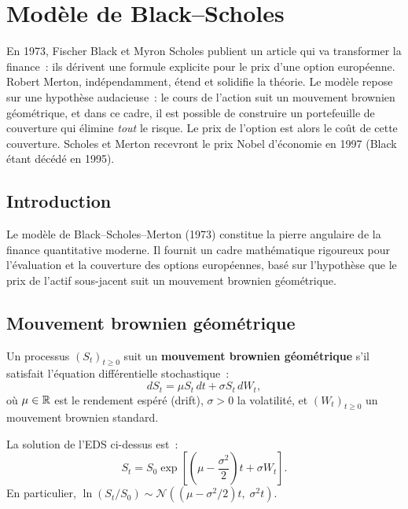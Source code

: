 \chapter{Mod\`ele de Black--Scholes}
\label{ch:black_scholes}

En 1973, Fischer Black et Myron Scholes publient un article qui va
transformer la finance~: ils d\'erivent une formule explicite pour le prix
d'une option europ\'eenne. Robert Merton, ind\'ependamment, \'etend et
solidifie la th\'eorie. Le mod\`ele repose sur une hypoth\`ese audacieuse~:
le cours de l'action suit un mouvement brownien g\'eom\'etrique, et dans ce
cadre, il est possible de construire un portefeuille de couverture qui
\'elimine \emph{tout} le risque. Le prix de l'option est alors le co\^ut de
cette couverture. Scholes et Merton recevront le prix Nobel d'\'economie en
1997 (Black \'etant d\'ec\'ed\'e en 1995).

\section{Introduction}

Le mod\`ele de Black--Scholes--Merton (1973) constitue la pierre angulaire
de la finance quantitative moderne. Il fournit un cadre math\'ematique
rigoureux pour l'\'evaluation et la couverture des options europ\'eennes,
bas\'e sur l'hypoth\`ese que le prix de l'actif sous-jacent suit un
mouvement brownien g\'eom\'etrique.

\section{Mouvement brownien g\'eom\'etrique}

\begin{definition}
Un processus $(S_t)_{t \geq 0}$ suit un \textbf{mouvement brownien
g\'eom\'etrique} s'il satisfait l'\'equation diff\'erentielle stochastique~:
\[
    dS_t = \mu S_t \, dt + \sigma S_t \, dW_t,
\]
o\`u $\mu \in \mathbb{R}$ est le rendement esp\'er\'e (drift), $\sigma > 0$ la
volatilit\'e, et $(W_t)_{t \geq 0}$ un mouvement brownien standard.
\end{definition}

\begin{theoreme}
\label{thm:solution_mbg}
La solution de l'EDS ci-dessus est~:
\[
    S_t = S_0 \exp\!\left[\left(\mu - \frac{\sigma^2}{2}\right)t
          + \sigma W_t\right].
\]
En particulier, $\ln(S_t/S_0) \sim \mathcal{N}\!\left((\mu - \sigma^2/2)t,\;
\sigma^2 t\right)$.
\end{theoreme}

